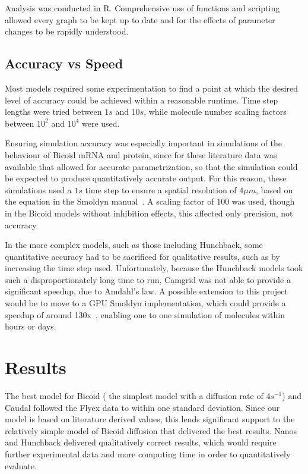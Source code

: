 \documentclass[11pt,a4paper,twocolumn]{article}
\begin{document}
Analysis was conducted in R. Comprehensive use of functions and scripting allowed every graph to be kept up to date and for the effects of parameter changes to be rapidly understood.

\subsection{Accuracy vs Speed}
Most models required some experimentation to find a point at which the desired level of accuracy could be achieved within a reasonable runtime. Time step lengths were tried between \(1s\) and \(10s\), while molecule number scaling factors between \(10^2\) and \(10^4\) were used. 

Ensuring simulation accuracy was especially important in simulations of the behaviour of Bicoid mRNA and protein, since for these literature data was available that allowed for accurate parametrization, so that the simulation could be expected to produce quantitatively accurate output. For this reason, these simulations used a \(1s\) time step to ensure a spatial resolution of \(4\mu m\), based on the equation in the Smoldyn manual~\cite{Andrews2011}. A scaling factor of 100 was used, though in the Bicoid models without inhibition effects, this affected only precision, not accuracy.

In the more complex models, such as those including Hunchback, some quantitative accuracy had to be sacrificed for qualitative results, such as by increasing the time step used. Unfortunately, because the Hunchback models took such a disproportionately long time to run, Camgrid was not able to provide a significant speedup, due to Amdahl’s law. A possible extension to this project would be to move to a GPU Smoldyn implementation, which could provide a speedup of around 130x~\cite{Dematte2010}, enabling one to one simulation of molecules within hours or days.


\section{Results}
The best model for Bicoid ( the simplest model with a diffusion rate of \(4s^{-1}\)) and Caudal followed the Flyex data to within one standard deviation. Since our model is based on literature derived values, this lends significant support to the relatively simple model of Bicoid diffusion that delivered the best results. Nanos and Hunchback delivered qualitatively correct results, which would require further experimental data and more computing time in order to quantitatively evaluate.

\nocite{*}
\pagebreak[4]


\end{document}
